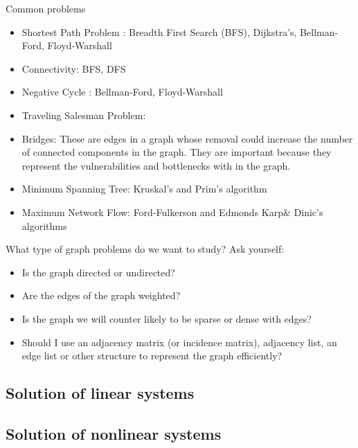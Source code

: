 \documentclass[xcolor=dvipsnames]{beamer}
\begin{document}
\begin{frame}{Common problems}
	\begin{itemize}
		\item Shortest Path Problem : Breadth First Search (BFS), Dijkstra's, Bellman-Ford, Floyd-Warshall
		\item Connectivity: BFS, DFS
		\item Negative Cycle : Bellman-Ford, Floyd-Warshall
		\item Traveling Salesman Problem: 
		\item Bridges: These are edges in a graph whose removal could increase the number of connected components in the graph. They are important because they represent the vulnerabilities and bottlenecks with in the graph.
		\item Minimum Spanning Tree: Kruskal's and Prim's algorithm
		\item Maximum Network Flow: Ford-Fulkerson and Edmonds Karp\& Dinic's algorithms
	\end{itemize}
\end{frame}

\begin{frame}{What type of graph problems do we want to study?}
Ask yourself:
	\begin{itemize}
		\item Is the graph directed or undirected?
		\item Are the edges of the graph weighted?
		\item Is the graph we will counter likely to be sparse or dense with edges?
		\item Should I use an adjacency matrix (or incidence matrix), adjacency list, an edge list or other structure to represent the graph efficiently?
	\end{itemize}
\end{frame}

\subsection{Solution of linear systems}

\subsection{Solution of nonlinear systems}
\end{document}
